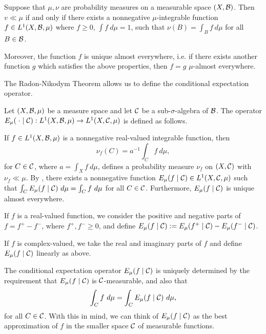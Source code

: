 \begin{theorem} \label{thm:radon-nikodym}
	Suppose that $\mu, \nu$ are probability measures on a measurable space $(X, \mathcal{B})$. Then $v \ll \mu$ if and only if there exists a nonnegative $\mu$-integrable function $f \in L^1(X, \mathcal{B}, \mu)$ where $f \geq 0$, $\int{f\ d\mu} = 1$, such that $\nu(B) = \int_B{f\ d\mu}$ for all $B \in \mathcal{B}$.
	
	Moreover, the function $f$ is unique almost everywhere, i.e. if there exists another function $g$ which satisfies the above properties, then $f = g$ $\mu$-almost everywhere.
\end{theorem}

The Radon-Nikodym Theorem allows us to define the conditional expectation operator.

\begin{definition}
	Let $(X, \mathcal{B}, \mu)$ be a measure space and let $\mathcal{C}$ be a sub-$\sigma$-algebra of $\mathcal{B}$. The  operator $E_\mu(\mathrel{}\cdot\mathrel{} \mid \mathcal{C}) : L^1(X, \mathcal{B}, \mu) \to L^1(X, \mathcal{C}, \mu)$ is defined as follows.
	
	If $f \in L^1(X, \mathcal{B}, \mu)$ is a nonnegative real-valued integrable function, then
	\[
		\nu_f(C) = a^{-1}\int_C{f\ d\mu},
	\]
	for $C \in \mathcal{C}$, where $a = \int_X{f\ d\mu}$, defines a probability measure $\nu_f$ on $(X, \mathcal{C})$ with $\nu_f \ll \mu$. By , there exists a nonnegative function $E_\mu(f \mid \mathcal{C}) \in L^1(X, \mathcal{C}, \mu)$ such that $\int_C{E_\mu(f \mid \mathcal{C})\ d\mu} = \int_C{f\ d\mu}$ for all $C \in \mathcal{C}$. Furthermore, $E_\mu(f \mid \mathcal{C})$ is unique almost everywhere.
	
	If $f$ is a real-valued function, we consider the positive and negative parts of $f = f^+ - f^-$, where $f^+, f^- \geq 0$, and define $E_\mu(f \mid \mathcal{C}) := E_\mu(f^+ \mid \mathcal{C}) - E_\mu(f^- \mid \mathcal{C})$.
	
	If $f$ is complex-valued, we take the real and imaginary parts of $f$ and define $E_\mu(f \mid \mathcal{C})$ linearly as above.
\end{definition}

The conditional expectation operator $E_\mu(f \mid \mathcal{C})$ is uniquely determined by the requirement that $E_\mu(f \mid \mathcal{C})$ is $\mathcal{C}$-measurable, and also that
\[
	\int_C{f\ d\mu} = \int_C{E_\mu(f \mid \C)\ d\mu},
\]
for all $C \in \mathcal{C}$. With this in mind, we can think of $E_\mu(f \mid \mathcal{C})$ as the best approximation of $f$ in the smaller space $\mathcal{C}$ of measurable functions.~\cite[Lecture 21]{ergodic-lectures}

